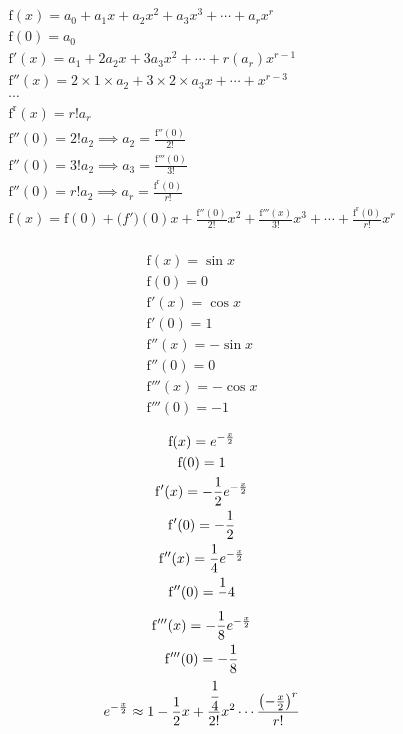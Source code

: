 \documentclass{article}
\begin{document}
\begin{gather}
	\mathrm{f}(x) = a_0 + a_1x + a_2 x^2 + a_3 x^3 + \cdots + a_r x^r \\
	\mathrm{f}(0) = a_0 \\
	\mathrm{f'}(x) = a_1 + 2a_2 x + 3a_3 x^2 + \cdots + r(a_r) x^{r-1} \\
	\mathrm{f''}(x) = 2 \times 1 \times a_2 + 3 \times 2 \times a_3 x + \cdots + x^{r-3} \\
	\cdots \\
	\mathrm{f^r}(x) = r!a_r \\
	\mathrm{f''}(0) = 2!a_2 \implies a_2 = \frac{\mathrm{f''}(0)}{2!} \\
	\mathrm{f''}(0) = 3!a_2 \implies a_3 = \frac{\mathrm{f'''}(0)}{3!} \\
	\mathrm{f''}(0) = r!a_2 \implies a_r = \frac{\mathrm{f^r}(0)}{r!} \\
	\mathrm{f}(x) = \mathrm{f}(0) + \mathrm(f')(0)x + \frac{\mathrm{f''}(0)}{2!}x^2
	+ \frac{\mathrm{f'''}(x)}{3!}x^3 + \cdots + \frac{\mathrm{f^r}(0)}{r!}x^r \\
\end{gather}

\begin{gather}
	\mathrm{f}(x) = \sin x \\
	\mathrm{f}(0) = 0 \\
	\mathrm{f'}(x) = \cos x \\
	\mathrm{f'}(0) = 1 \\
	\mathrm{f''}(x) = - \sin x \\
	\mathrm{f''}(0) = 0 \\
	\mathrm{f'''}(x) = - \cos x \\
	\mathrm{f'''}(0) = - 1
\end{gather}

\begin{gather}
	\mathrm{f}(x) = e^{-\frac{x}{2}} \\
	\mathrm{f}(0) = 1 \\
	\mathrm{f'}(x) = -\frac{1}{2} e^{-\frac{x}{2}} \\
	\mathrm{f'}(0) = -\frac{1}{2} \\
	\mathrm{f''}(x) = \frac{1}{4} e^{-\frac{x}{2}} \\
	\mathrm{f''}(0) = \frac{1}{}4 \\
	\mathrm{f'''}(x) = -\frac{1}{8} e^{-\frac{x}{2}} \\
	\mathrm{f'''}(0) = -\frac{1}{8} \\
	e^{-\frac{x}{2}} \approx 1 - \frac{1}{2}x + \frac{\cfrac{1}{4}}{2!}x^2 \cdots \frac{\left (-\frac{x}{2} \right )^r}{r !}
\end{gather}
\end{document}
